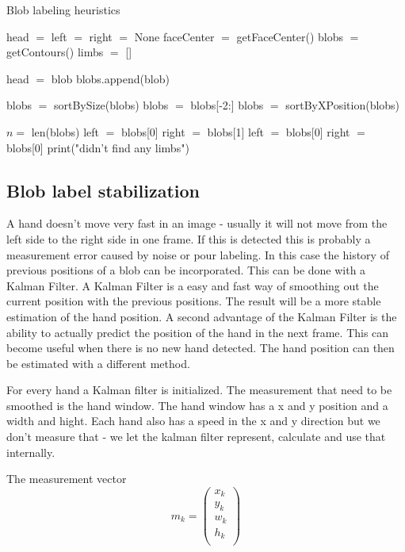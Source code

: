 \begin{algorithm}
\caption{Blob labeling heuristics}
\label{blobheuristics}
\begin{algorithmic}
	\STATE head $=$ left $=$ right $=$ None
	\STATE faceCenter $=$ getFaceCenter()
	\STATE blobs $=$ getContours()
	\STATE limbs $=$ []
	
			\STATE head $=$ blob
		\ELSE
			\STATE blobs.append(blob)
		\ENDIF
	\ENDFOR

	\STATE blobs $=$ sortBySize(blobs)
	\STATE blobs $=$ blobs[-2:]
	\STATE blobs $=$ sortByXPosition(blobs)

	\STATE $n = $ len(blobs)
	    \STATE left $=$ blobs[0]
	    \STATE right $=$ blobs[1]
	\ELSE
		        \STATE left $=$ blobs[0]
		    \ELSE
		        \STATE right $=$ blobs[0]
			\ENDIF
		\ENDIF
	\ELSE
	    \STATE print("didn't find any limbs")
	\ENDIF
\end{algorithmic}
\end{algorithm}



\subsection*{Blob label stabilization}
A hand doesn't move very fast in an image - usually it will not move from the left side to the right side in one frame. If this is detected this is probably a measurement error caused by noise or pour labeling. In this case the history of previous positions of a blob can be incorporated. This can be done with a Kalman Filter. A Kalman Filter is a easy and fast way of smoothing out the current position with the previous positions. The result will be a more stable estimation of the hand position. A second advantage of the Kalman Filter is the ability to actually predict the position of the hand in the next frame. This can become useful when there is no new hand detected. The hand position can then be estimated with a different method.

For every hand a Kalman filter is initialized. The measurement that need to be smoothed is the hand window. The hand window has a x and y position and a width and hight. Each hand also has a speed in the x and y direction but we don't measure that - we let the kalman filter represent, calculate and use that internally. 

The measurement vector \[ m_k = \left(
\begin{array}{c}
	x_k \\ %
	y_k \\ %
	w_k \\ %
	h_k \\ %
\end{array} \right)\]


